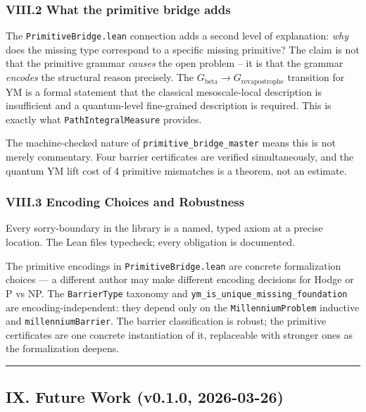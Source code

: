 \documentclass[12pt,a4paper]{article}
\begin{document}
\subsubsection{VIII.2 What the primitive bridge adds}

The \texttt{PrimitiveBridge.lean} connection adds a second level of explanation: \emph{why} does the missing type correspond to a specific missing primitive? The claim is not that the primitive grammar \emph{causes} the open problem  --  it is that the grammar \emph{encodes} the structural reason precisely. The $G_{\text{beta}} \to G_{\text{revapostrophe}}$ transition for YM is a formal statement that the classical mesoscale-local description is insufficient and a quantum-level fine-grained description is required. This is exactly what \texttt{PathIntegralMeasure} provides.

The machine-checked nature of \texttt{primitive\_bridge\_master} means this is not merely commentary. Four barrier certificates are verified simultaneously, and the quantum YM lift cost of 4 primitive mismatches is a theorem, not an estimate.

\subsubsection{VIII.3 Encoding Choices and Robustness}

Every sorry-boundary in the library is a named, typed axiom at a precise location. The Lean files typecheck; every obligation is documented.

The primitive encodings in \texttt{PrimitiveBridge.lean} are concrete formalization choices --- a different author may make different encoding decisions for Hodge or P vs NP. The \texttt{BarrierType} taxonomy and \texttt{ym\_is\_unique\_missing\_foundation} are encoding-independent: they depend only on the \texttt{MillenniumProblem} inductive and \texttt{millenniumBarrier}. The barrier classification is robust; the primitive certificates are one concrete instantiation of it, replaceable with stronger ones as the formalization deepens.

\begin{center}
\rule{0.5\textwidth}{0.4pt}
\end{center}

\subsection{IX. Future Work (v0.1.0, 2026-03-26)}
\end{document}
